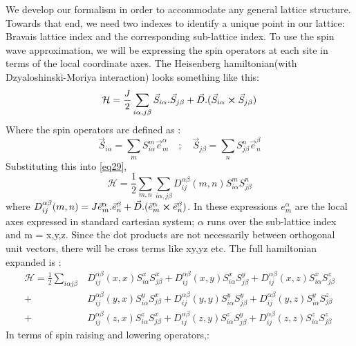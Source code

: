 We develop our formalism in order to accommodate any general lattice structure. Towards that end, we need two indexes to identify a unique point in our lattice: Bravais lattice index and the corresponding sub-lattice index. To use the spin wave approximation, we will be expressing the spin operators at each site in terms of the local coordinate axes. The Heisenberg hamiltonian(with Dzyaloshinski-Moriya interaction) looks something like this:
\begin{equation}\label{eq29}
\mathcal{H} = \frac{J}{2}\sum_{i\alpha,j\beta}^{}\vec{S}_{i\alpha}.\vec{S}_{j\beta} + \vec{D} . (\vec{S}_{i\alpha} \cross \vec{S}_{j\beta})
\end{equation}
Where the spin operators are defined as :
\begin{equation}\label{eq30}
\vec{S}_{i\alpha} = \sum_{m}^{}S^m_{i\alpha}\vec{e}^\alpha_m \quad;\quad \vec{S}_{j\beta} = \sum_{n}^{}S^n_{j\beta}\vec{e}^\beta_n
\end{equation}
Substituting this into \ref{eq29},
\begin{equation}\label{eq31}
\mathcal{H} = \frac{1}{2}\sum_{m,n}^{}\sum_{i\alpha,j\beta}^{}D^{\alpha \beta}_{ij}(m,n)S^m_{i\alpha}S^n_{j\beta}
\end{equation}
where $ D^{\alpha \beta}_{ij}(m,n) = J\vec{e}^\alpha_m.\vec{e}^\beta_n + \vec{D}.(\vec{e}^\alpha_m \cross \vec{e}^\beta_n)$. In these expressions $ e^\alpha_{m} $ are the local axes expressed in standard cartesian system; $ \alpha $ runs over the sub-lattice index and m = x,y,z. Since the dot products are not necessarily between orthogonal unit vectors, there will be cross terms like xy,yz etc. The full hamiltonian expanded is :
\begin{equation}\label{eq32}
\begin{split}
\mathcal{H} = \frac{1}{2} \sum_{i\alpha j\beta}^{}  &D^{\alpha \beta}_{ij}(x,x)S^x_{i\alpha}S^x_{j\beta} + D^{\alpha \beta}_{ij}(x,y)S^x_{i\alpha}S^y_{j\beta} + D^{\alpha \beta}_{ij}(x,z)S^x_{i\alpha}S^z_{j\beta}\\ + &D^{\alpha \beta}_{ij}(y,x)S^y_{i\alpha}S^x_{j\beta} + D^{\alpha \beta}_{ij}(y,y)S^y_{i\alpha}S^y_{j\beta} + D^{\alpha \beta}_{ij}(y,z)S^y_{i\alpha}S^z_{j\beta}\\ + &D^{\alpha \beta}_{ij}(z,x)S^z_{i\alpha}S^x_{j\beta} + D^{\alpha \beta}_{ij}(z,y)S^z_{i\alpha}S^y_{j\beta} + D^{\alpha \beta}_{ij}(z,z)S^z_{i\alpha}S^z_{j\beta}  
\end{split}			
\end{equation} 
In terms of spin raising and lowering operators,:
